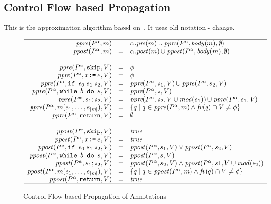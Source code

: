 \documentclass[10pt,notitlepage,twoside]{article}
\newcommand{\pre}{\mathit{pre}}
\newcommand{\post}{\mathit{post}}
\newcommand{\ppre}{\mathit{ppre}}
\newcommand{\ppost}{\mathit{ppost}}
\newcommand{\mod}{\mathit{mod}}
\newcommand{\fv}{\mathit{fv}}
\newcommand{\true}{\mathit{true}}
\begin{document}
\newpage

\subsection{Control Flow based Propagation}\label{sec:cf}

This is the approximation algorithm based on~\cite{PaBaBu03}.
It uses old notation - change.
\begin{figure}[tbp]
\begin{displaymath}
\begin{array}{rcl}
\hline 
\ppre(P^\alpha,m) & = & \alpha.\pre(m) \cup \ppre(P^\alpha,\mathit{body}(m),\emptyset) \\
\ppost(P^\alpha,m) & = & \alpha.\post(m) \cup \ppost(P^\alpha,\mathit{body}(m),\emptyset) \\
\ \\
\ppre(P^\alpha,\texttt{skip},V) & = & \phi  \\
\ppre(P^\alpha,x \texttt{:=}\; e,V) & = & \phi \\
\ppre(P^\alpha,\texttt{if }e_0\;s_1\;s_2,V) & = & \ppre(P^\alpha,s_1,V) \cup \ppre(P^\alpha,s_2,V) \\
\ppre(P^\alpha,\texttt{while }b\texttt{ do }s,V) & = & \ppre(P^\alpha,s,V) \\
\ppre(P^\alpha,s_1; s_2,V) & = & \ppre(P^\alpha,s_2,V\cup\mod(s_1)) \cup \ppre(P^\alpha,s_1,V)  \\
\ppre(P^\alpha,m(e_1,\ldots,e_{|m|}),V) & = & \{ q \mid q \in \ppre(P^\alpha,m) \wedge \fv(q) \cap V \neq \phi  \} \\
\ppre(P^\alpha,\texttt{return},V) & = & \emptyset  \\
\ \\
\ppost(P^\alpha,\texttt{skip},V) & = & \true  \\
\ppost(P^\alpha,x \texttt{:=}\; e,V) & = & \true \\
\ppost(P^\alpha,\texttt{if }e_0\;s_1\;s_2,V) & = & \ppost(P^\alpha,s_1,V) \vee \ppost(P^\alpha,s_2,V) \\
\ppost(P^\alpha,\texttt{while }b\texttt{ do }s,V) & = & \ppost(P^\alpha,s,V)  \\
\ppost(P^\alpha,s_1; s_2,V) & = & \ppost(P^\alpha,s_2,V) \wedge \ppost(P^\alpha,s1,V\cup\mod(s_2))  \\
\ppost(P^\alpha,m(e_1,\ldots,e_{|m|}),V) & = & \{ q \mid q \in \ppost(P^\alpha,m) \wedge \fv(q) \cap V \neq \phi   \}\\
\ppost(P^\alpha,\texttt{return},V) & = & \true \\
\hline
\end{array}
\end{displaymath}
\caption{Control Flow based Propagation of Annotations}\label{fig:propagation}
\end{figure}
\end{document}
